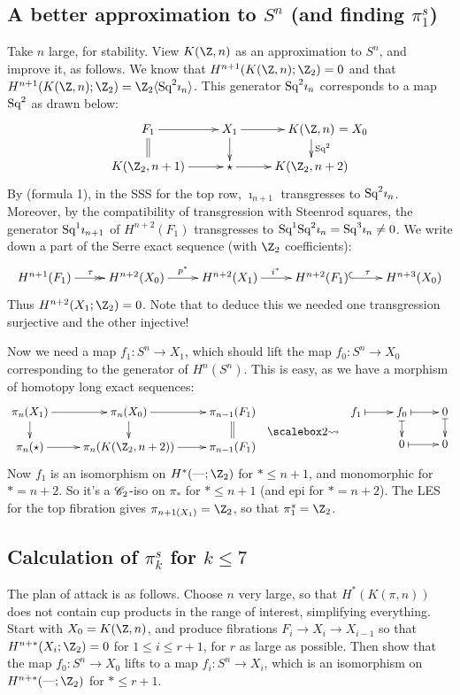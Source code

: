 \documentclass[11pt]{article}
\begin{document}
{\subsection{A better approximation to \texorpdfstring{$S^n$}{Sn}
 (and finding \texorpdfstring{$\pi_1^s$}{the stable 1-stem})}
Take $n$ large, for stability. View $K(\Z,n)$ as an approximation to $S^n$, and improve it, as follows. We know that $H^{n+1}(K(\Z,n);\Z_2)=0$ and that $H^{n+1}(K(\Z,n);\Z_2)=\Z_2\langle\Squ^2\imath_n\rangle$. This generator $\textup{Sq}^2\imath_n$ corresponds to a map $\textup{Sq}^2$ as drawn below:
\[\xymatrix@R=5mm{
F_1\ar[r]\ar@{=}[d]&X_1\ar[d]\ar[r]&K(\Z,n)\makebox[0cm][l]{\,\,$=X_0$}\ar[d]^{\Squ^2}\\
K(\Z_2,n+1)\ar[r]&\star\ar[r]&K(\Z_2,n+2)
}\]
By (formula 1), in the SSS for the top row, $\imath_{n+1}$ transgresses to $\textup{Sq}^2\imath_n$. Moreover, by the compatibility of transgression with Steenrod squares, the generator $\textup{Sq}^1\imath_{n+1}$ of $H^{n+2}(F_1)$ transgresses to $\textup{Sq}^1\textup{Sq}^2\imath_{n}=\textup{Sq}^3\imath_{n}\neq0$.
We write down a part of the Serre exact sequence (with $\Z_2$ coefficients):
\[\xymatrix{
H^{n+1}(F_1)\ar@{->>}[r]^{\tau}&H^{n+2}(X_0)\ar[r]^{p^*}&H^{n+2}(X_1)\ar[r]^{i^*}&H^{n+2}(F_1)\ar@{^{(}->}[r]^{\tau}&H^{n+3}(X_0)
}\]
Thus $H^{n+2}(X_1;\Z_2)=0$. Note that to deduce this we needed one transgression surjective and the other injective!

Now we need a map $f_1:S^n\to X_1$, which should lift the map $f_0:S^n\to X_0$ corresponding to the generator of $H^n(S^n)$. This is easy, as we have a morphism of homotopy long exact sequences:
\[\xymatrix@R=5mm{
\pi_n(X_1)\ar[r]\ar[d]&\pi_n(X_0)\ar[r]\ar[d]&\pi_{n-1}(F_1)\ar@{=}[d]\\
\pi_n(\star)\ar[r]&\pi_n(K(\Z_2,n+2))\ar[r]&\pi_{n-1}(F_1)\\
}\raisebox{-.6cm}{\ \ $\bigrightsquig$\ \ }
\xymatrix@R=5mm{
f_1\ar@{|->}[r]&f_0\ar@{|->}[r]\ar@{|->}[d]&0\ar@{|->}[d]\\
&0\ar@{|->}[r]&0
}\]
Now $f_1$ is an isomorphism on $H^*(\DASH;\Z_2)$ for $*\leq n+1$, and 
monomorphic for $*=n+2$. So it's a $\mathscr{C}_2$-iso on $\pi_*$ for 
$*\leq n+1$ (and epi for $*=n+2$). The LES for the top fibration gives 
$\pi_{n+1(X_1)}=\Z_2$, so that $\pi_1^s=\Z_2$.

\subsection{Calculation of \texorpdfstring{$\pi_k^s$ for $k\leq7$}{stable 
k-stem, k<8}}
The plan of attack is as follows. Choose $n$ very large, so that $H^*(K(\pi,n))$
does not contain cup products in the range of interest, simplifying everything.
Start with $X_0=K(\Z,n)$, and produce fibrations $F_i\to X_i\to X_{i-1}$ so that
$H^{n+*}(X_i;\Z_2)=0$ for $1\leq i\leq r+1$, for $r$ as large as possible. Then 
show that the map $f_0:S^n\to X_0$ lifts to a map $f_i:S^n\to X_i$, which is an
isomorphism on $H^{n+*}(\DASH;\Z_2)$ for $*\leq r+1$.

}
\end{document}
